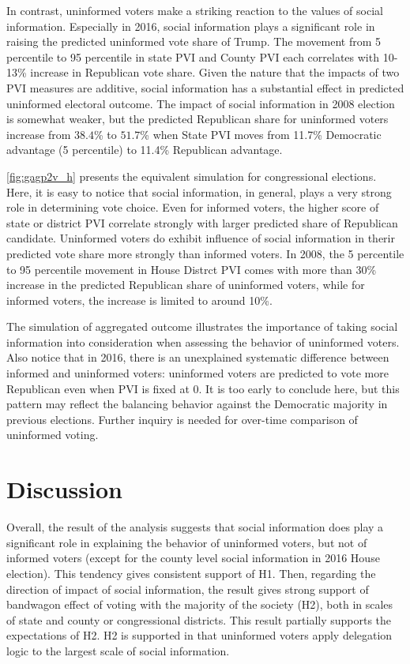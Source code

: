 \documentclass[doc,natbib,12pt]{apa6}\usepackage[]{graphicx}\usepackage[]{color}
\begin{document}
    \par In contrast, uninformed voters make a striking reaction to the values of social information. Especially in 2016, social information plays a significant role in raising the predicted uninformed vote share of Trump. The movement from 5 percentile to 95 percentile in state PVI and County PVI each correlates with 10-13\% increase in Republican vote share. Given the nature that the impacts of two PVI measures are additive, social information has a substantial effect in predicted uninformed electoral outcome. The impact of social information in 2008 election is somewhat weaker, but the predicted Republican share for uninformed voters increase from $38.4$\% to $51.7$\% when State PVI moves from 11.7\% Democratic advantage (5 percentile) to 11.4\% Republican advantage.

    \par \autoref{fig:gagp2v_h} presents the equivalent simulation for congressional elections. Here, it is easy to notice that social information, in general, plays a very strong role in determining vote choice. Even for informed voters, the higher score of state or district PVI correlate strongly with larger predicted share of Republican candidate. Uninformed voters do exhibit influence of social information in therir predicted vote share more strongly than informed voters. In 2008, the 5 percentile to 95 percentile movement in House Distrct PVI comes with more than 30\% increase in the predicted Republican share of uninformed voters, while for informed voters, the increase is limited to around 10\%.   

    \par The simulation of aggregated outcome illustrates the importance of taking social information into consideration when assessing the behavior of uninformed voters. Also notice that in 2016, there is an unexplained systematic difference between informed and uninformed voters: uninformed voters are predicted to vote more Republican even when PVI is fixed at 0. It is too early to conclude here, but this pattern may reflect the balancing behavior against the Democratic majority in previous elections. Further inquiry is needed for over-time comparison of uninformed voting.  
    
    \section{Discussion}
    
    \par Overall, the result of the analysis suggests that social information does play a significant role in explaining the behavior of uninformed voters, but not of informed voters (except for the county level social information in 2016 House election). This tendency gives consistent support of H1. Then, regarding the direction of impact of social information, the result gives strong support of bandwagon effect of voting with the majority of the society (H2), both in scales of state and county or congressional districts. This result partially supports the expectations of H2. H2 is supported in that uninformed voters apply delegation logic to the largest scale of social information. 
    
\end{document}
